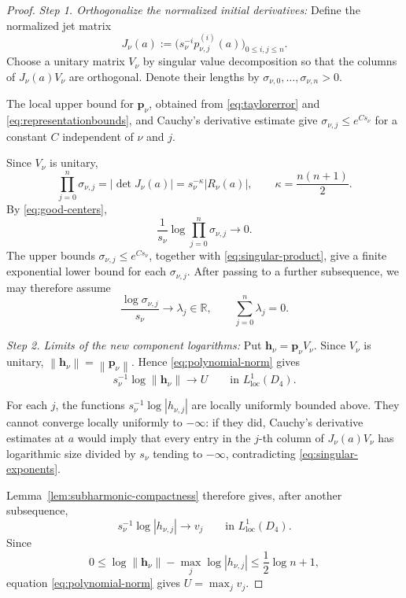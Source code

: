 \documentclass[12pt,letterpaper,reqno]{amsart}
\theoremstyle{definition}
\numberwithin{equation}{section}
\newcommand{\R}{\mathbb R}
\newcommand{\loc}{\mathrm{loc}}
\newcommand{\norm}[1]{\left\lVert#1\right\rVert}
\newcommand{\pv}{\bm p}
\newcommand{\hv}{\bm h}
\begin{document}
\begin{proof}

\medskip\noindent
\emph{{Step 1. Orthogonalize the normalized initial derivatives:}}
Define the normalized jet matrix
\[
J_\nu(a)
:=
\bigl(
s_\nu^{-i}p_{\nu,j}^{(i)}(a)
\bigr)_{0\leq i,j\leq n}.
\]
Choose a unitary matrix \(V_\nu\) by singular value decomposition so
that the columns of \(J_\nu(a)V_\nu\) are orthogonal. Denote their
lengths by
\(\sigma_{\nu,0},\ldots,\sigma_{\nu,n}>0\).

The local upper bound for \(\pv_\nu\), obtained from
\eqref{eq:taylorerror} and \eqref{eq:representationbounds}, and
Cauchy's derivative estimate give
\(\sigma_{\nu,j}\leq e^{Cs_\nu}\) for a constant \(C\) independent of
\(\nu\) and \(j\).

Since \(V_\nu\) is unitary,
\[
\prod_{j=0}^{n}\sigma_{\nu,j}
=
|\det J_\nu(a)|
=
s_\nu^{-\kappa}|R_\nu(a)|,
\qquad
\kappa=\frac{n(n+1)}2.
\]
By \eqref{eq:good-centers},
\begin{equation}\label{eq:singular-product}
 \frac1{s_\nu}
 \log
 \prod_{j=0}^{n}\sigma_{\nu,j}
 \longrightarrow0.
\end{equation}
The upper bounds
\(\sigma_{\nu,j}\leq e^{Cs_\nu}\), together with
\eqref{eq:singular-product}, give a finite exponential lower bound for
each \(\sigma_{\nu,j}\). After passing to a further subsequence, we may
therefore assume
\begin{equation}\label{eq:singular-exponents}
 \frac{\log\sigma_{\nu,j}}{s_\nu}
 \longrightarrow
 \lambda_j\in\R,
 \qquad
 \sum_{j=0}^{n}\lambda_j=0.
\end{equation}


\medskip\noindent
\emph{{Step 2. Limits of the new component logarithms:}}
Put \(\hv_\nu=\pv_\nu V_\nu\).
Since \(V_\nu\) is unitary,
\(\norm{\hv_\nu}=\norm{\pv_\nu}\). Hence
\eqref{eq:polynomial-norm} gives
\[
s_\nu^{-1}\log\norm{\hv_\nu}
\longrightarrow U
\qquad\text{in }L^1_{\loc}(D_4).
\]

For each \(j\), the functions
\(s_\nu^{-1}\log|h_{\nu,j}|\) are locally uniformly bounded above.
They cannot converge locally uniformly to \(-\infty\): if they did,
Cauchy's derivative estimates at \(a\) would imply that every entry in
the \(j\)-th column of \(J_\nu(a)V_\nu\) has logarithmic size divided
by \(s_\nu\) tending to \(-\infty\), contradicting
\eqref{eq:singular-exponents}.

Lemma~\ref{lem:subharmonic-compactness} therefore gives, after another
subsequence,
\[
s_\nu^{-1}\log|h_{\nu,j}|
\longrightarrow v_j
\qquad\text{in }L^1_{\loc}(D_4).
\]
Since
\[
0\leq
\log\norm{\hv_\nu}
-
\max_j\log|h_{\nu,j}|
\leq
\frac12\log {n+1},
\]
equation \eqref{eq:polynomial-norm} gives
\(U=\max_jv_j\).


\end{proof}
\end{document}
